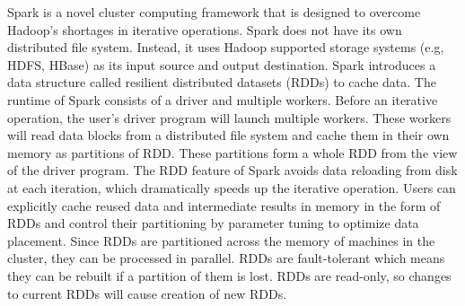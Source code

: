 \documentclass[10pt,conference,compsocconf]{IEEEtran}
\begin{document}
 
Spark is a novel cluster computing framework that is designed to overcome Hadoop's shortages in iterative operations. Spark does not have its own distributed file system. Instead, it uses Hadoop supported storage systems (e.g, HDFS, HBase) as its input source and output destination.  Spark introduces a data structure called resilient distributed datasets (RDDs)  to cache data. The runtime of Spark consists of a driver and multiple workers. Before an iterative operation, the user's driver program will launch multiple workers. These workers will read data blocks from a distributed file system and cache them in their own memory as partitions of RDD. These partitions form a whole RDD from the view of the driver program. The RDD feature of Spark avoids data reloading from disk at each iteration, which dramatically speeds up the iterative operation. Users can explicitly cache reused data and intermediate results in memory in the form of RDDs and control their partitioning by parameter tuning to optimize data placement. Since RDDs are partitioned across the memory of machines in the cluster, they can be processed in parallel. RDDs are fault-tolerant which means they can be rebuilt if a partition of them is lost. RDDs are read-only, so changes to current RDDs will cause creation of new RDDs.



\end{document}
